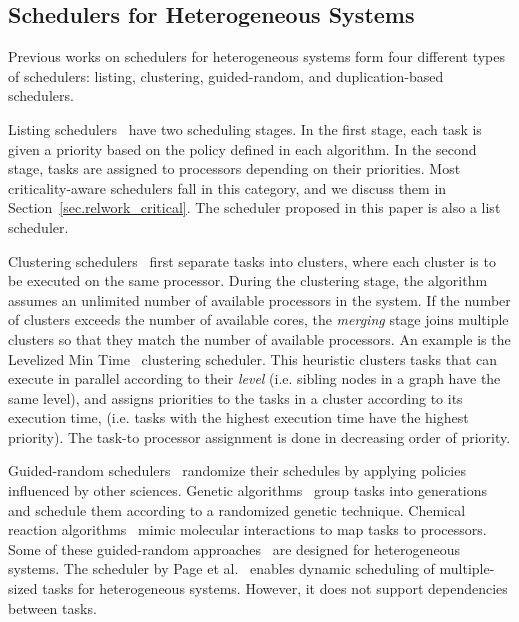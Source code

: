 
\subsection{Schedulers for Heterogeneous Systems}

Previous works on schedulers for heterogeneous systems form four different types of schedulers: listing, clustering, guided-random, and duplication-based schedulers.


Listing schedulers~\cite{List, DCPS, LDCP, HEFT, CrPathDup} have two scheduling stages. In the first stage, each task is given a priority based on the policy defined in each algorithm. In the second stage, tasks are assigned to processors depending on their priorities. Most criticality-aware schedulers fall in this category, and we discuss them in Section~\ref{sec.relwork_critical}. The scheduler proposed in this paper is also a list scheduler.

Clustering schedulers~\cite{Hypertool, DSC, DCPS, Hetero95} first separate tasks into clusters, where each cluster is to be executed on the same processor. During the clustering stage, the algorithm assumes an unlimited number of available processors in the system. If the number of clusters exceeds the number of available cores, the \textit{merging} stage joins multiple clusters so that they match the number of available processors. An example is the Levelized Min Time~\cite{Hetero95} clustering scheduler. This heuristic clusters tasks that can execute in parallel according to their \textit{level} (i.e. sibling nodes in a graph have the same level), and assigns priorities to the tasks in a cluster according to its execution time, (i.e. tasks with the highest execution time have the highest priority). The task-to processor assignment is done in decreasing order of priority.

Guided-random schedulers~\cite{Gen07, Chemical, Dyn05} randomize their schedules by applying policies influenced by other sciences. Genetic algorithms~\cite{Gen07} group tasks into generations and schedule them according to a randomized genetic technique. Chemical reaction algorithms~\cite{Chemical} mimic molecular interactions to map tasks to processors. Some of these guided-random approaches~\cite{Gen07, Chemical} are designed for heterogeneous systems. The scheduler by Page et al.~\cite{Dyn05} enables dynamic scheduling of multiple-sized tasks for heterogeneous systems. However, it does not support dependencies between tasks.

